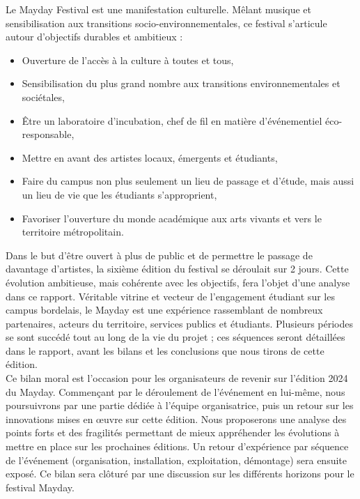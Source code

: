 \documentclass[12pt,a4paper]{report}
\begin{document}
Le Mayday Festival est une manifestation culturelle. Mêlant musique et sensibilisation aux transitions socio-environnementales, ce festival s'articule autour d'objectifs durables et ambitieux :
\begin{itemize}
\item Ouverture de l’accès à la culture à toutes et tous,
\item Sensibilisation du plus grand nombre aux transitions environnementales et sociétales,
\item Être un laboratoire d’incubation, chef de fil en matière d’événementiel éco-responsable,
\item Mettre en avant des artistes locaux, émergents et étudiants,
\item Faire du campus non plus seulement un lieu de passage et d'étude, mais aussi un lieu de vie que les étudiants s'approprient,
\item Favoriser l’ouverture du monde académique aux arts vivants et vers le territoire métropolitain.\\
\end{itemize}

Dans le but d’être ouvert à plus de public et de permettre le passage de davantage d’artistes, la sixième édition du festival se déroulait sur 2 jours. Cette évolution ambitieuse, mais cohérente avec les objectifs, fera l’objet d’une analyse dans ce rapport. Véritable vitrine et vecteur de l'engagement étudiant sur les campus bordelais, le Mayday est une expérience rassemblant de nombreux partenaires, acteurs du territoire, services publics et étudiants. Plusieurs périodes se sont succédé tout au long de la vie du projet ; ces séquences seront détaillées dans le rapport, avant les bilans et les conclusions que nous tirons de cette édition.\\

Ce bilan moral est l’occasion pour les organisateurs de revenir sur l’édition 2024 du Mayday. Commençant par le déroulement de l'événement en lui-même, nous poursuivrons par une partie dédiée à l'équipe organisatrice, puis un retour sur les innovations mises en œuvre sur cette édition. Nous proposerons une analyse des points forts et des fragilités permettant de mieux appréhender les évolutions à mettre en place sur les prochaines éditions. Un retour d'expérience par séquence de l'événement (organisation, installation, exploitation, démontage) sera ensuite exposé. Ce bilan sera clôturé par une discussion sur les différents horizons pour le festival Mayday.
\end{document}

